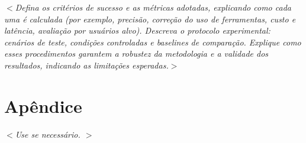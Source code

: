 \documentclass[12pt]{article}
\begin{document}
\textit{$<$Defina os critérios de sucesso e as métricas adotadas, explicando como cada uma é calculada (por exemplo, precisão, correção do uso de ferramentas, custo e latência, avaliação por usuários alvo). Descreva o protocolo experimental: cenários de teste, condições controladas e \textit{baselines} de comparação. Explique como esses procedimentos garantem a robustez da metodologia e a validade dos resultados, indicando as limitações esperadas.$>$}

\section*{Apêndice}
\label{sec:apendice}

\textit{$<$Use se necessário. $>$}



\newpage

{}
\end{document}
